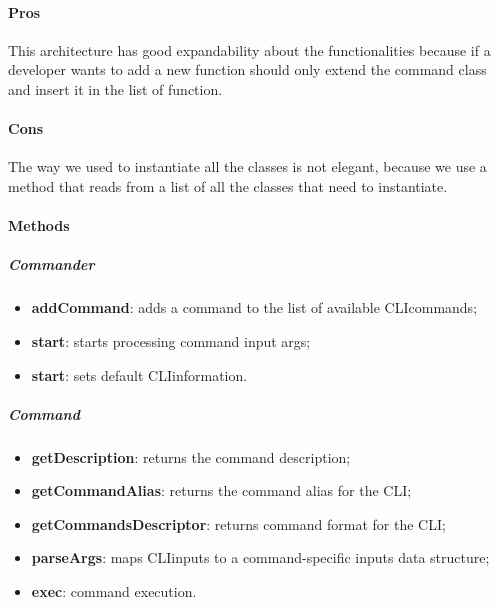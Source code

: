 \paragraph{Pros}
This architecture has good expandability about the functionalities because if a developer wants to add a new function should only extend the command class and insert it in the list of function.
\paragraph{Cons}
The way we used to instantiate all the classes is not elegant, because we use a method that reads from a list of all the classes that need to instantiate.

\paragraph{Methods}
\subparagraph{Commander}
\begin{itemize}
    \item \textbf{addCommand}: adds a command to the list of available CLI\glo commands;
    \item \textbf{start}: starts processing command input args;
    \item \textbf{start}: sets default CLI\glo information.
\end{itemize}
\subparagraph{Command}
\begin{itemize}
    \item \textbf{getDescription}: returns the command description;
    \item \textbf{getCommandAlias}: returns the command alias for the CLI\glo;
    \item \textbf{getCommandsDescriptor}: returns command format for the CLI\glo;
    \item \textbf{parseArgs}: maps CLI\glo inputs to a command-specific inputs data structure;
    \item \textbf{exec}: command execution.
\end{itemize}
